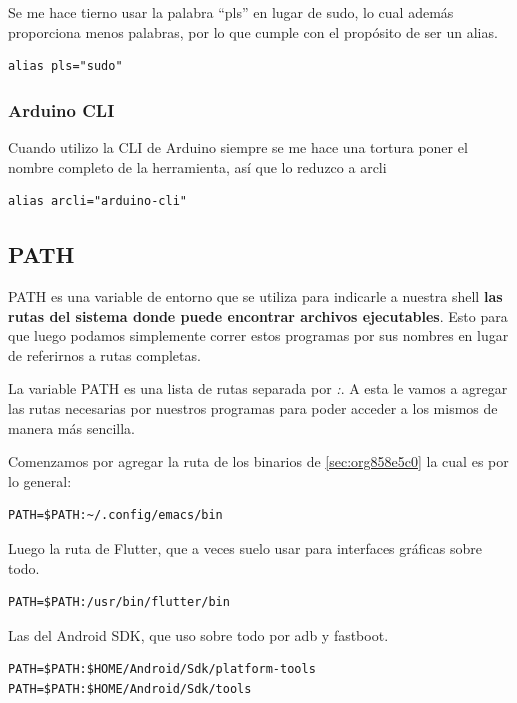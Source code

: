 \documentclass[11pt]{article}
\begin{document}
Se me hace tierno usar la palabra ``pls'' en lugar de sudo, lo cual además proporciona menos palabras, por lo que cumple con el propósito de ser un alias.

\begin{verbatim}
alias pls="sudo"
\end{verbatim}
\subsubsection{Arduino CLI}
\label{sec:org35238c1}

Cuando utilizo la CLI de Arduino siempre se me hace una tortura poner el nombre completo de la herramienta, así que lo reduzco a arcli

\begin{verbatim}
alias arcli="arduino-cli"

\end{verbatim}
\subsection{PATH}
\label{sec:orgdd15c59}

PATH es una variable de entorno que se utiliza para indicarle a nuestra shell \textbf{las rutas del sistema donde puede encontrar archivos ejecutables}. Esto para que luego podamos simplemente correr estos programas por sus nombres en lugar de referirnos a rutas completas.

La variable PATH es una lista de rutas separada por \emph{:}. A esta le vamos a agregar las rutas necesarias por nuestros programas para poder acceder a los mismos de manera más sencilla.

Comenzamos por agregar la ruta de los binarios de \ref{sec:org858e5c0} la cual es por lo general:

\begin{verbatim}
PATH=$PATH:~/.config/emacs/bin
\end{verbatim}

Luego la ruta de Flutter, que a veces suelo usar para interfaces gráficas sobre todo.

\begin{verbatim}
PATH=$PATH:/usr/bin/flutter/bin
\end{verbatim}

Las del Android SDK, que uso sobre todo por adb y fastboot.

\begin{verbatim}
PATH=$PATH:$HOME/Android/Sdk/platform-tools
PATH=$PATH:$HOME/Android/Sdk/tools
\end{verbatim}
\end{document}
